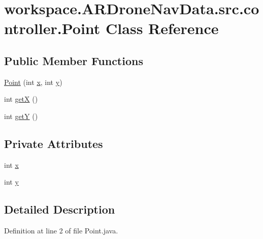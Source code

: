 \hypertarget{classworkspace_1_1_a_r_drone_nav_data_1_1src_1_1controller_1_1_point}{}\section{workspace.\+A\+R\+Drone\+Nav\+Data.\+src.\+controller.\+Point Class Reference}
\label{classworkspace_1_1_a_r_drone_nav_data_1_1src_1_1controller_1_1_point}
\subsection*{Public Member Functions}
\begin{DoxyCompactItemize}
\item 
\hyperlink{classworkspace_1_1_a_r_drone_nav_data_1_1src_1_1controller_1_1_point_a3114987c73d9733c03141eff428a0b92}{Point} (int \hyperlink{classworkspace_1_1_a_r_drone_nav_data_1_1src_1_1controller_1_1_point_a8d4acd5ce5b1ecd9aee12297fa92dd81}{x}, int \hyperlink{classworkspace_1_1_a_r_drone_nav_data_1_1src_1_1controller_1_1_point_ab5594ca87f8ea9afd474efa2c193395e}{y})
\item 
int \hyperlink{classworkspace_1_1_a_r_drone_nav_data_1_1src_1_1controller_1_1_point_adc7ad3cae0a39ef10a807861e3edbea7}{get\+X} ()
\item 
int \hyperlink{classworkspace_1_1_a_r_drone_nav_data_1_1src_1_1controller_1_1_point_a74f50fe3f7ba605c0267d6d2acbc1a90}{get\+Y} ()
\end{DoxyCompactItemize}
\subsection*{Private Attributes}
\begin{DoxyCompactItemize}
\item 
int \hyperlink{classworkspace_1_1_a_r_drone_nav_data_1_1src_1_1controller_1_1_point_a8d4acd5ce5b1ecd9aee12297fa92dd81}{x}
\item 
int \hyperlink{classworkspace_1_1_a_r_drone_nav_data_1_1src_1_1controller_1_1_point_ab5594ca87f8ea9afd474efa2c193395e}{y}
\end{DoxyCompactItemize}


\subsection{Detailed Description}


Definition at line 2 of file Point.\+java.



